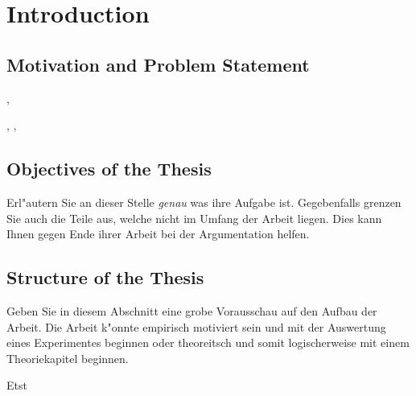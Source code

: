 \chapter[Introduction]{Introduction}

\section{Motivation and Problem Statement}

\cite{alzint_dementia_statistics}, \cite{who_dementia_factsheet}

\cite{Zucchella.2018}

\cite{Mably.2018}, \cite{Iaccarino.2016}, \cite{Martorell.2019}

\section{Objectives of the Thesis}

Erl"autern Sie an dieser Stelle \emph{genau} was ihre Aufgabe ist. Gegebenfalls grenzen Sie auch die Teile aus, welche nicht im Umfang der Arbeit liegen. Dies kann Ihnen gegen Ende ihrer Arbeit bei der Argumentation helfen.

\section{Structure of the Thesis}

Geben Sie in diesem Abschnitt eine grobe Vorausschau auf den Aufbau der Arbeit. Die Arbeit k"onnte empirisch motiviert sein und mit der Auswertung eines Experimentes beginnen oder theoreitsch und somit logischerweise mit einem Theoriekapitel beginnen.


Etst